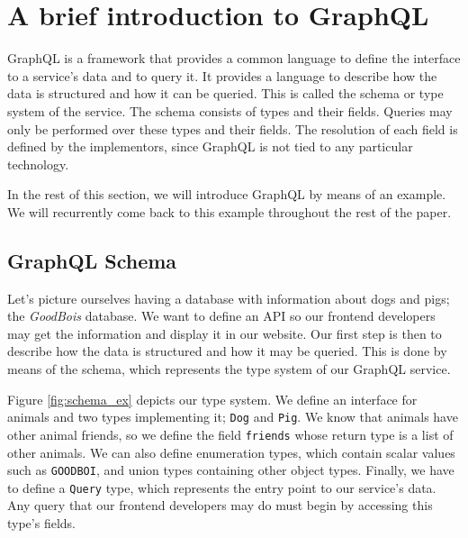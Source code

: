 \section{A brief introduction to GraphQL}\label{sec:bg}

GraphQL is a framework that provides a common language to define the interface to a service's data and to query it.
It provides a language to describe how the data is structured and how it can be queried. This is called the schema or type system of the service. The schema consists of types and their fields. Queries may only be performed over these types and their fields. The resolution of each field is defined by the implementors, since GraphQL is not tied to any particular technology.

In the rest of this section, we will introduce GraphQL by means of an example. We will recurrently come back to this example throughout the rest of the paper.

\subsection*{GraphQL Schema}

Let's picture ourselves having a database with information about dogs and pigs; the \textit{GoodBois} database. We want to define an API so our frontend developers may get the information and display it in our website. Our first step is then to describe how the data is structured and how it may be queried. This is done by means of the schema, which represents the type system of our GraphQL service.

Figure \ref{fig:schema_ex} depicts our type system. We define an interface for animals and two types implementing it; \texttt{Dog} and \texttt{Pig}. We know that animals have other animal friends, so we define the field \texttt{friends} whose return type is a list of other animals. We can also define enumeration types, which contain scalar values such as \texttt{GOODBOI}, and union types containing other object types. Finally, we have to define a \texttt{Query} type, which represents the entry point to our service's data. Any query that our frontend developers may do must begin by accessing this type's fields.

